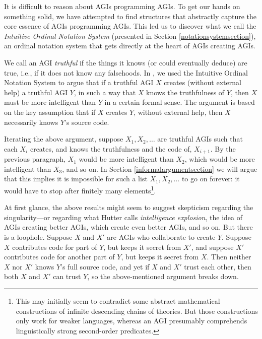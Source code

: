 \documentclass[runningheads]{llncs}
\begin{document}
It is difficult to reason about AGIs programming AGIs. To get our hands on something solid,
we have attempted to find structures that abstractly capture the core essence of
AGIs programming AGIs. This led us to discover
what we call the \emph{Intuitive Ordinal Notation System} (presented in Section
\ref{notationsystemsection}), an ordinal notation system that gets directly at
the heart of AGIs creating AGIs.

We call an AGI \emph{truthful} if the things it knows (or could eventually deduce) are true,
i.e., if it does not know any falsehoods.
In \cite{alexander2019measuring}, we used the Intuitive Ordinal Notation System to argue
that if a truthful AGI $X$ creates (without external help) a truthful AGI $Y$, in such a way
that $X$ knows the truthfulness of $Y$, then $X$ must be more intelligent than $Y$
in a certain formal sense. The argument is based on the key assumption that if $X$
creates $Y$, without external help, then $X$ necessarily knows $Y$'s source code.

Iterating the above argument, suppose $X_1,X_2,\ldots$
are truthful AGIs such that each $X_i$ creates, and knows the truthfulness and
the code of, $X_{i+1}$. By the previous paragraph, $X_1$ would be more
intelligent than $X_2$, which would be more
intelligent than $X_3$, and so on.
In Section \ref{informalargumentsection} we will argue that this implies
it is impossible for such
a list $X_1,X_2,\ldots$ to go on forever: it would have to stop after finitely
many elements\footnote{This may initially seem to contradict some abstract mathematical
constructions \cite{kripke2019ungroundedness}
\cite{visser2002semantics} of infinite descending chains of theories. But those
constructions only work for weaker languages, whereas an AGI presumably comprehends
linguistically strong second-order predicates.}.

At first glance, the above results might
seem to suggest skepticism regarding the singularity---or regarding
what Hutter \cite{hutter2012} calls \emph{intelligence explosion}, the idea of
AGIs creating better AGIs, which create even better AGIs, and so on.
But there is a loophole. Suppose $X$ and $X'$ are AGIs
who collaborate to create $Y$. Suppose $X$ contributes code for
part of $Y$, but keeps it secret from $X'$, and suppose $X'$ contributes
code for another part of $Y$, but keeps it secret from $X$. Then neither
$X$ nor $X'$ knows $Y$'s full source code, and yet if $X$ and $X'$ trust
each other, then both $X$ and $X'$ can trust $Y$, so the above-mentioned
argument breaks down.
\end{document}
